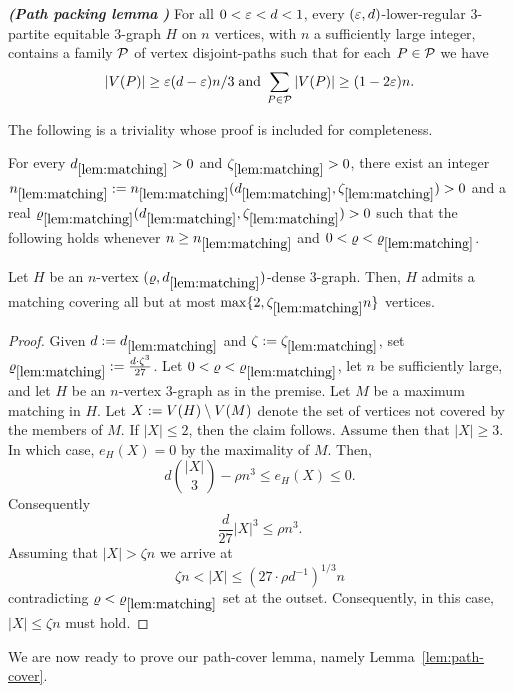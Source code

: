 \documentclass[11pt,reqno]{amsart}
\def\matref{\mathrm{\ref{lem:matching}}}
\begin{document}
\begin{lemma}\label{lem:pack}{\em{\bf (Path packing lemma} \cite[Claim~4.2]{RRS08}{\bf)}}
For all $0<\eps < d < 1$, every $(\eps,d)$-lower-regular $3$-partite equitable $3$-graph $H$ on $n$ vertices, with $n$ a sufficiently large integer, contains a family $\P$ of vertex disjoint-paths such that for each $P \in \P$ we have 
$$
|V(P)| \geq \eps(d-\eps)n/3 \mand \sum_{P \in \P} |V(P)| \geq (1-2\eps)n.
$$  
\end{lemma}


The following is a triviality whose proof is included for completeness.  

\begin{lemma}\label{lem:matching} 
For every $d_{\matref} > 0$ and $\zeta_{\matref} > 0$, there exist an integer $n_{\matref}:=n_{\matref}(d_{\matref},\zeta_{\matref}) >0 $ and a real $\rho_{\matref}(d_{\matref},\zeta_{\matref}) >0 $ such that the following holds whenever $n \geq n_{\matref}$ and $0 < \rho < \rho_{\matref}$. 

Let $H$ be an $n$-vertex $(\rho,d_{\matref})$-dense $3$-graph. Then, $H$ admits a matching covering all but at most $\max\{2,\zeta_{\matref}n\}$ vertices. 
\end{lemma}

\begin{proof}
Given $d:= d_{\matref}$ and $\zeta := \zeta_{\matref}$, set $
\rho_{\matref} := \frac{d \cdot \zeta^3}{27}$. Let $0< \rho < \rho_{\matref}$, let $n$ be sufficiently large, and let $H$ be an $n$-vertex $3$-graph as in the premise. Let $M$ be a maximum matching in $H$. Let $X := V(H) \sm V(M)$ denote the set of vertices not covered by the members of $M$. If $|X| \leq 2$, then the claim follows. Assume then that $|X| \geq 3$. In which case, $e_H(X) = 0$ by the maximality of $M$. Then, 
$$
d\binom{|X|}{3} - \rho n^3 \leq e_H(X) \leq 0.
$$
Consequently
$$
\frac{d}{27}|X|^3 \leq \rho n^3.
$$
Assuming that $|X| > \zeta n$ we arrive at 
$$
\zeta n < |X| \leq (27 \cdot \rho d^{-1})^{1/3} n
$$
contradicting $\rho < \rho_{\matref}$ set at the outset. Consequently, in this case, $|X| \leq \zeta n$ must hold. 
\end{proof}


We are now ready to prove our path-cover lemma, namely Lemma~\ref{lem:path-cover}.
\end{document}
